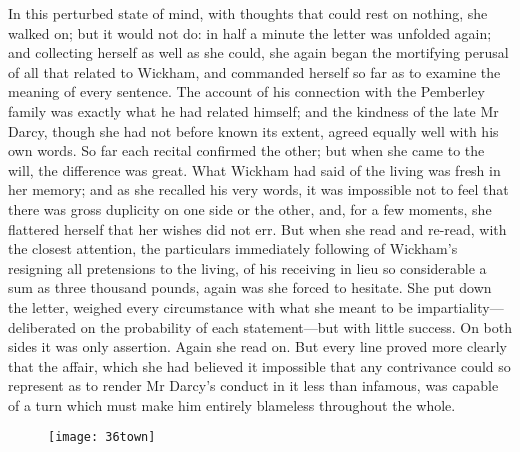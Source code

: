 In this perturbed state of mind, with thoughts that could rest on nothing, she walked on; but it would not do: in half a minute the letter was unfolded again; and collecting herself as well as she could, she again began the mortifying perusal of all that related to Wickham, and commanded herself so far as to examine the meaning of every sentence. The account of his connection with the Pemberley family was exactly what he had related himself; and the kindness of the late Mr Darcy, though she had not before known its extent, agreed equally well with his own words. So far each recital confirmed the other; but when she came to the will, the difference was great. What Wickham had said of the living was fresh in her memory; and as she recalled his very words, it was impossible not to feel that there was gross duplicity on one side or the other, and, for a few moments, she flattered herself that her wishes did not err. But when she read and re-read, with the closest attention, the particulars immediately following of Wickham's resigning all pretensions to the living, of his receiving in lieu so considerable a sum as three thousand pounds, again was she forced to hesitate. She put down the letter, weighed every circumstance with what she meant to be impartiality—deliberated on the probability of each statement—but with little success. On both sides it was only assertion. Again she read on. But every line proved more clearly that the affair, which she had believed it impossible that any contrivance could so represent as to render Mr Darcy's conduct in it less than infamous, was capable of a turn which must make him entirely blameless throughout the whole.

\begin{figure}[tbph]
\centering
\texttt{[image: 36town]}
\end{figure}

